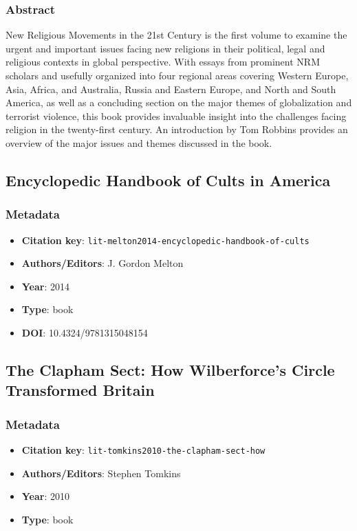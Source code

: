 \subsubsection*{Abstract}
New Religious Movements in the 21st Century is the first volume to examine the urgent and important issues facing new religions in their political, legal and religious contexts in global perspective. With essays from prominent NRM scholars and usefully organized into four regional areas covering Western Europe, Asia, Africa, and Australia, Russia and Eastern Europe, and North and South America, as well as a concluding section on the major themes of globalization and terrorist violence, this book provides invaluable insight into the challenges facing religion in the twenty-first century. An introduction by Tom Robbins provides an overview of the major issues and themes discussed in the book.

\subsection{Encyclopedic Handbook of Cults in America}\label{lit:lit-melton2014-encyclopedic-handbook-of-cults}
\subsubsection*{Metadata}
\begin{itemize}
  \item \textbf{Citation key}: \texttt{lit-melton2014-encyclopedic-handbook-of-cults}
  \item \textbf{Authors/Editors}: J. Gordon Melton
  \item \textbf{Year}: 2014
  \item \textbf{Type}: book
  \item \textbf{DOI}: 10.4324/9781315048154
\end{itemize}

\subsection{The Clapham Sect: How Wilberforce's Circle Transformed Britain}\label{lit:lit-tomkins2010-the-clapham-sect-how}
\subsubsection*{Metadata}
\begin{itemize}
  \item \textbf{Citation key}: \texttt{lit-tomkins2010-the-clapham-sect-how}
  \item \textbf{Authors/Editors}: Stephen Tomkins
  \item \textbf{Year}: 2010
  \item \textbf{Type}: book
\end{itemize}
